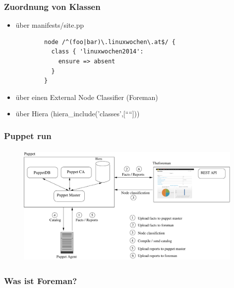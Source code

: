 \documentclass{beamer}
\begin{document}
\begin{frame}[fragile]
  \frametitle{Zuordnung von Klassen}

  \begin{itemize}
    \item über manifests/site.pp
      \begin{lstlisting}
        node /^(foo|bar)\.linuxwochen\.at$/ {
          class { 'linuxwochen2014':
            ensure => absent
          }
        }
      \end{lstlisting}
  \item über einen External Node Classifier (Foreman)
  \item über Hiera (hiera\_include('classes',[````]))
  \end{itemize}
\end{frame}


\begin{frame}
  \frametitle{Puppet run}
  \begin{figure}[ht]
    \centering
      \includegraphics[height=6cm,width=11cm]{../pics/puppet_overview}
    \label{fig:stack}
  \end{figure}
\end{frame}

\begin{frame}
  \frametitle{Was ist Foreman?}
  \begin{figure}[ht]
    \centering
    \label{fig:stack}
  \end{figure}
\end{frame}
\end{document}
